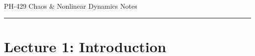 ﻿\documentclass[12pt]{article}
\begin{document}
\begin{center}
{\LARGE PH-429 Chaos \& Nonlinear Dynamics Notes\par}
\end{center}
\hrule
\vspace{1.5em}

\section*{Lecture 1: Introduction}
\end{document}

